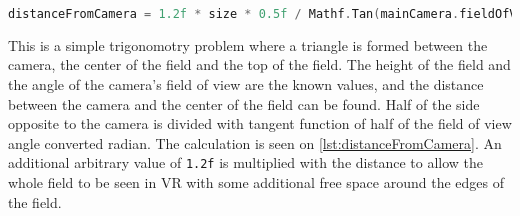 \begin{lstlisting}[caption={Calculation of the distance between the camera and field}, captionpos=b,language=C,label={lst:distanceFromCamera}]
    distanceFromCamera = 1.2f * size * 0.5f / Mathf.Tan(mainCamera.fieldOfView * 0.5f * Mathf.Deg2Rad);
\end{lstlisting}
This is a simple trigonomotry problem where a triangle is formed between the camera, the center of the field and the top of the field.
The height of the field and the angle of the camera's field of view are the known values, and the distance between the camera and the center of the field can be found. 
Half of the side opposite to the camera is divided with tangent function of half of the field of view angle converted radian.
The calculation is seen on \autoref{lst:distanceFromCamera}.
An additional arbitrary value of \texttt{1.2f} is multiplied with the distance to allow the whole field to be seen in VR with some additional free space around the edges of the field.